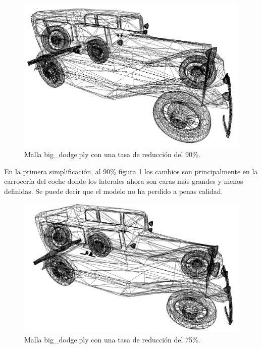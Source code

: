 \begin{figure} %
	\centering
	\includegraphics[scale=0.25]{imagenes/coche_90.png} 
	\caption{Malla big\_dodge.ply con una tasa de reducción del 90\%.} \label{fig:coche_90.png}
\end{figure}

En la primera simplificación, al 90\% figura \ref{fig:coche_90.png} los cambios son principalmente en la carrocería del coche donde los laterales ahora son caras más grandes y menos definidas. Se puede decir que el modelo no ha perdido a penas calidad.\\

\begin{figure} %
	\centering
	\includegraphics[scale=0.25]{imagenes/coche_75.png} 
	\caption{Malla big\_dodge.ply con una tasa de reducción del 75\%.} \label{fig:coche_75.png}
\end{figure}

